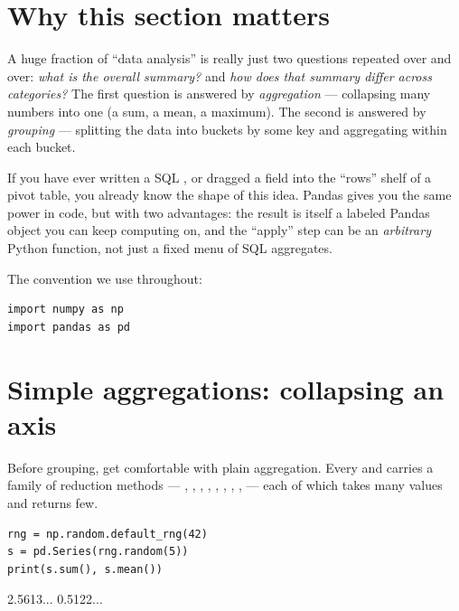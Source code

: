 \documentclass[11pt]{article}
\begin{document}

\section{Why this section matters}

\begin{background}
A huge fraction of ``data analysis'' is really just two questions repeated over and over: \emph{what is the overall summary?} and \emph{how does that summary differ across categories?} The first question is answered by \emph{aggregation} --- collapsing many numbers into one (a sum, a mean, a maximum). The second is answered by \emph{grouping} --- splitting the data into buckets by some key and aggregating within each bucket.

If you have ever written a SQL , or dragged a field into the ``rows'' shelf of a pivot table, you already know the shape of this idea. Pandas gives you the same power in code, but with two advantages: the result is itself a labeled Pandas object you can keep computing on, and the ``apply'' step can be an \emph{arbitrary} Python function, not just a fixed menu of SQL aggregates.
\end{background}

The convention we use throughout:

\begin{lstlisting}
import numpy as np
import pandas as pd
\end{lstlisting}

\section{Simple aggregations: collapsing an axis}

Before grouping, get comfortable with plain aggregation. Every  and  carries a family of reduction methods --- , , , , , , , ,  --- each of which takes many values and returns few.

\begin{lstlisting}
rng = np.random.default_rng(42)
s = pd.Series(rng.random(5))
print(s.sum(), s.mean())
\end{lstlisting}

\begin{outblock}
2.5613... 0.5122...
\end{outblock}
\end{document}
